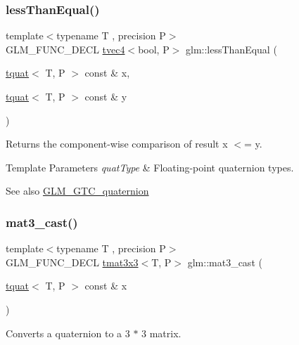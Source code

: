 \subsubsection{\texorpdfstring{less\+Than\+Equal()}{lessThanEqual()}}
{\footnotesize\ttfamily template$<$typename T , precision P$>$ \\
G\+L\+M\+\_\+\+F\+U\+N\+C\+\_\+\+D\+E\+CL \hyperlink{structglm_1_1tvec4}{tvec4}$<$bool, P$>$ glm\+::less\+Than\+Equal (\begin{DoxyParamCaption}\item[{\hyperlink{structglm_1_1tquat}{tquat}$<$ T, P $>$ const \&}]{x,  }\item[{\hyperlink{structglm_1_1tquat}{tquat}$<$ T, P $>$ const \&}]{y }\end{DoxyParamCaption})}

Returns the component-\/wise comparison of result x $<$= y.


\begin{DoxyTemplParams}{Template Parameters}
{\em quat\+Type} & Floating-\/point quaternion types.\\
\hline
\end{DoxyTemplParams}
\begin{DoxySeeAlso}{See also}
\hyperlink{group__gtc__quaternion}{G\+L\+M\+\_\+\+G\+T\+C\+\_\+quaternion} 
\end{DoxySeeAlso}
\mbox{\label{group__gtc__quaternion_gae04c39422eb4e450ec8c4f45a1057b40}} 
\subsubsection{\texorpdfstring{mat3\+\_\+cast()}{mat3\_cast()}}
{\footnotesize\ttfamily template$<$typename T , precision P$>$ \\
G\+L\+M\+\_\+\+F\+U\+N\+C\+\_\+\+D\+E\+CL \hyperlink{structglm_1_1tmat3x3}{tmat3x3}$<$T, P$>$ glm\+::mat3\+\_\+cast (\begin{DoxyParamCaption}\item[{\hyperlink{structglm_1_1tquat}{tquat}$<$ T, P $>$ const \&}]{x }\end{DoxyParamCaption})}

Converts a quaternion to a 3 $\ast$ 3 matrix.

